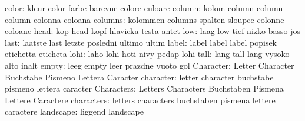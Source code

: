                     color: kleur                     color
                           farbe                     barevne
                           colore                    culoare
                   column: kolom                     column
                           column                    column
                           colonna                   coloana %
                  columns: kolommen                  columns
                           spalten                   sloupce
                           colonne                   coloane
                     head: kop                       head
                           kopf                      hlavicka
                           testa                     antet %
                      low: laag                      low
                           tief                      nizko
                           basso                     jos
                     last: laatste                   last
                           letzte                    posledni
                           ultimo                    ultim
                    label: label                     label
                           label                     popisek
                           etichetta                 eticheta
                     lohi: laho                      lohi
                           hoti                      nivy
                           pedap                     lohi %
                     tall: lang                      tall
                           lang                      vysoko
                           alto                      inalt %
                    empty: leeg                      empty
                           leer                      prazdne
                           vuoto                     gol
                Character: Letter                    Character
                           Buchstabe                 Pismeno
                           Lettera                   Caracter
                character: letter                    character
                           buchstabe                 pismeno
                           lettera                   caracter
               Characters: Letters                   Characters
                           Buchstaben                Pismena
                           Lettere                   Caractere
               characters: letters                   characters
                           buchstaben                pismena
                           lettere                   caractere
                landscape: liggend                   landscape
